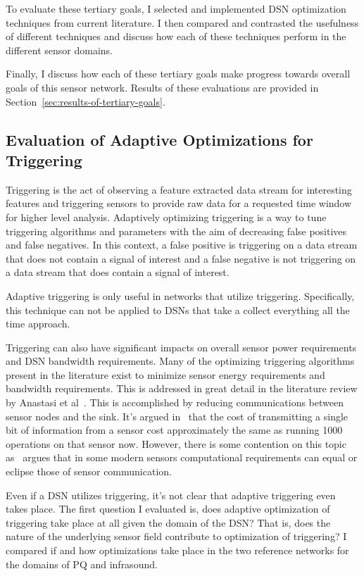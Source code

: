 To evaluate these tertiary goals, I selected and implemented DSN optimization techniques from current literature. I then compared and contrasted the usefulness of different techniques and discuss how each of these techniques perform in the different sensor domains.

Finally, I discuss how each of these tertiary goals make progress towards overall goals of this sensor network. Results of these evaluations are provided in Section~\ref{sec:results-of-tertiary-goals}.

\subsection{Evaluation of Adaptive Optimizations for Triggering}\label{subsec:evaluation-of-adaptive-optimizations-for-triggering}
Triggering is the act of observing a feature extracted data stream for interesting features and triggering sensors to provide raw data for a requested time window for higher level analysis. Adaptively optimizing triggering is a way to tune triggering algorithms and parameters with the aim of decreasing false positives and false negatives. In this context, a false positive is triggering on a data stream that does not contain a signal of interest and a false negative is not triggering on a data stream that does contain a signal of interest.

Adaptive triggering is only useful in networks that utilize triggering. Specifically, this technique can not be applied to DSNs that take a collect everything all the time approach.

Triggering can also have significant impacts on overall sensor power requirements and DSN bandwidth requirements. Many of the optimizing triggering algorithms present in the literature exist to minimize sensor energy requirements and bandwidth requirements. This is addressed in great detail in the literature review by Anastasi et al~\cite{anastasi_energy_2009}. This is accomplished by reducing communications between sensor nodes and the sink. It's argued in~\cite{pottie2000wireless} that the cost of transmitting a single bit of information from a sensor cost approximately the same as running 1000 operations on that sensor now. However, there is some contention on this topic as~\cite{alippi_adaptive_2010} argues that in some modern sensors computational requirements can equal or eclipse those of  sensor communication.

Even if a DSN utilizes triggering, it's not clear that adaptive triggering even takes place. The first question I evaluated is, does adaptive optimization of triggering take place at all given the domain of the DSN? That is, does the nature of the underlying sensor field contribute to optimization of triggering? I compared if and how optimizations take place in the two reference networks for the domains of PQ and infrasound.

